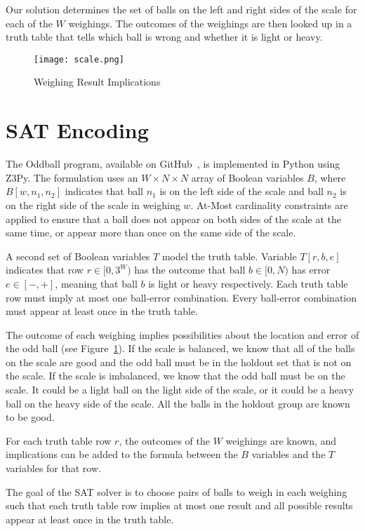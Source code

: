 \documentclass[conference]{IEEEtran}
\begin{document}
Our solution determines the set of balls on the left and right sides of the scale for each of the $W$ weighings.
The outcomes of the weighings are then looked up in a truth table that tells which ball is wrong and whether it is light or heavy.

\begin{figure}[!t]
\centerline{\texttt{[image: scale.png]}}
\caption{Weighing Result Implications}
\label{scale}
\end{figure}

\section{SAT Encoding}

The Oddball program, available on GitHub~\cite{b1}, is implemented in Python using Z3Py.
The formulation uses an $W \times N \times N$ array of Boolean variables $B$,
where $B[w, n_1, n_2]$ indicates that ball $n_1$ is on the left side of the scale and ball $n_2$ is on the right side of the scale
in weighing $w$.
At\nobreakdash-Most cardinality constraints are applied to ensure that a ball does not appear on both sides of the scale
at the same time, or appear more than once on the same side of the scale.

A second set of Boolean variables $T$ model the truth table.
Variable $T[r, b, e]$ indicates that row $r \in [0, 3^W)$ has the outcome that ball $b \in [0, N)$ has error $e \in [-, +]$,
meaning that ball $b$ is light or heavy respectively.
Each truth table row must imply at most one ball-error combination.
Every ball-error combination must appear at least once in the truth table.

The outcome of each weighing implies possibilities about the location and error of the odd ball (see Figure~\ref{scale}).
If the scale is balanced, we know that all of the balls on the scale are good and the odd ball must be in the holdout set
that is not on the scale.
If the scale is imbalanced, we know that the odd ball must be on the scale.
It could be a light ball on the light side of the scale, or it could be a heavy ball on the heavy side of the scale.
All the balls in the holdout group are known to be good.

For each truth table row $r$, the outcomes of the $W$ weighings are known, and implications can be added to the formula
between the $B$ variables and the $T$ variables for that row.

The goal of the SAT solver is to choose pairs of balls to weigh in each weighing such that each truth table row implies
at most one result and all possible results appear at least once in the truth table.
\end{document}

